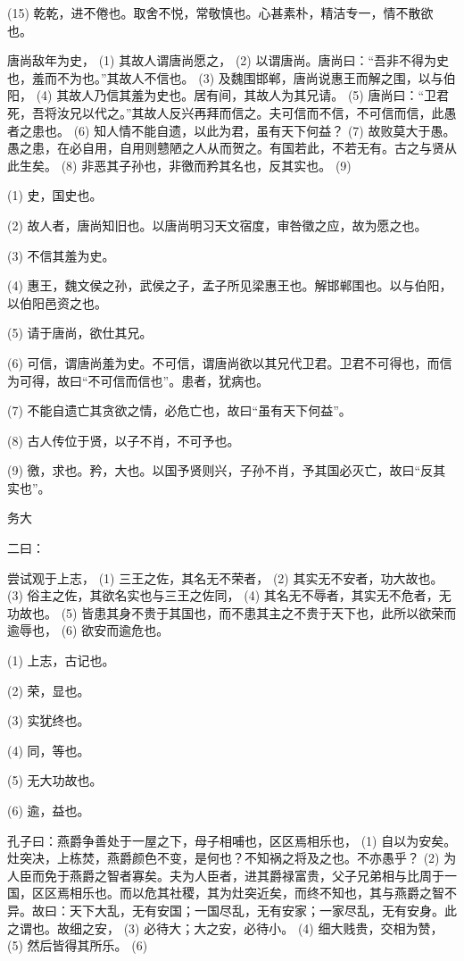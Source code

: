 \documentclass[12pt,UTF8]{ctexbook}
\begin{document}
(15) 乾乾，进不倦也。取舍不悦，常敬慎也。心甚素朴，精洁专一，情不散欲也。

唐尚敌年为史， (1) 其故人谓唐尚愿之， (2) 以谓唐尚。唐尚曰：“吾非不得为史也，羞而不为也。”其故人不信也。 (3) 及魏围邯郸，唐尚说惠王而解之围，以与伯阳， (4) 其故人乃信其羞为史也。居有间，其故人为其兄请。 (5) 唐尚曰：“卫君死，吾将汝兄以代之。”其故人反兴再拜而信之。夫可信而不信，不可信而信，此愚者之患也。 (6) 知人情不能自遗，以此为君，虽有天下何益？ (7) 故败莫大于愚。愚之患，在必自用，自用则戆陋之人从而贺之。有国若此，不若无有。古之与贤从此生矣。 (8) 非恶其子孙也，非徼而矜其名也，反其实也。 (9)

(1) 史，国史也。

(2) 故人者，唐尚知旧也。以唐尚明习天文宿度，审咎徵之应，故为愿之也。

(3) 不信其羞为史。

(4) 惠王，魏文侯之孙，武侯之子，孟子所见梁惠王也。解邯郸围也。以与伯阳，以伯阳邑资之也。

(5) 请于唐尚，欲仕其兄。

(6) 可信，谓唐尚羞为史。不可信，谓唐尚欲以其兄代卫君。卫君不可得也，而信为可得，故曰“不可信而信也”。患者，犹病也。

(7) 不能自遗亡其贪欲之情，必危亡也，故曰“虽有天下何益”。

(8) 古人传位于贤，以子不肖，不可予也。

(9) 徼，求也。矜，大也。以国予贤则兴，子孙不肖，予其国必灭亡，故曰“反其实也”。





务大


二曰：

尝试观于上志， (1) 三王之佐，其名无不荣者， (2) 其实无不安者，功大故也。 (3) 俗主之佐，其欲名实也与三王之佐同， (4) 其名无不辱者，其实无不危者，无功故也。 (5) 皆患其身不贵于其国也，而不患其主之不贵于天下也，此所以欲荣而逾辱也， (6) 欲安而逾危也。

(1) 上志，古记也。

(2) 荣，显也。

(3) 实犹终也。

(4) 同，等也。

(5) 无大功故也。

(6) 逾，益也。

孔子曰：燕爵争善处于一屋之下，母子相哺也，区区焉相乐也， (1) 自以为安矣。灶突决，上栋焚，燕爵颜色不变，是何也？不知祸之将及之也。不亦愚乎？ (2) 为人臣而免于燕爵之智者寡矣。夫为人臣者，进其爵禄富贵，父子兄弟相与比周于一国，区区焉相乐也。而以危其社稷，其为灶突近矣，而终不知也，其与燕爵之智不异。故曰：天下大乱，无有安国；一国尽乱，无有安家；一家尽乱，无有安身。此之谓也。故细之安， (3) 必待大；大之安，必待小。 (4) 细大贱贵，交相为赞， (5) 然后皆得其所乐。 (6)
\end{document}
